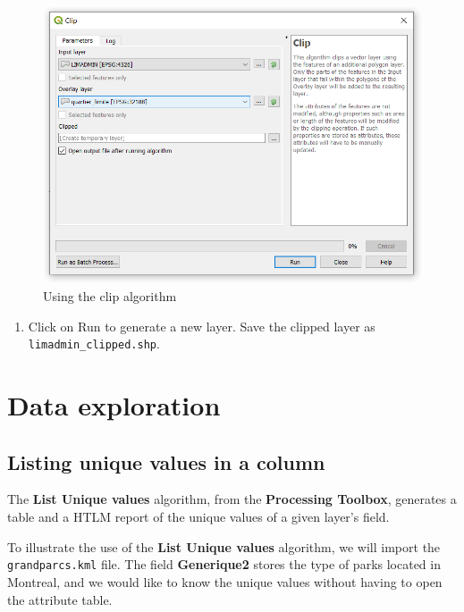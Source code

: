 \documentclass[]{book}
\providecommand{\tightlist}{%
  \setlength{\itemsep}{0pt}\setlength{\parskip}{0pt}}
\theoremstyle{definition}
\theoremstyle{definition}
\theoremstyle{definition}
\theoremstyle{remark}
\begin{document}
\begin{figure}

{\centering \includegraphics[width=11.57in]{figures/Clipping_Vectors_Dialog} 

}

\caption{Using the clip algorithm}\label{fig:unnamed-chunk-20}
\end{figure}

\begin{enumerate}
\def\labelenumi{\arabic{enumi}.}
\setcounter{enumi}{3}
\tightlist
\item
  Click on Run to generate a new layer. Save the clipped layer as
  \texttt{limadmin\_clipped.shp}.
\end{enumerate}

\chapter{Data exploration}\label{data-exploration}

\section{Listing unique values in a
column}\label{listing-unique-values-in-a-column}

The \textbf{List Unique values} algorithm, from the \textbf{Processing
Toolbox}, generates a table and a HTLM report of the unique values of a
given layer's field.

To illustrate the use of the \textbf{List Unique values} algorithm, we
will import the \texttt{grandparcs.kml} file. The field
\textbf{Generique2} stores the type of parks located in Montreal, and we
would like to know the unique values without having to open the
attribute table.
\end{document}
